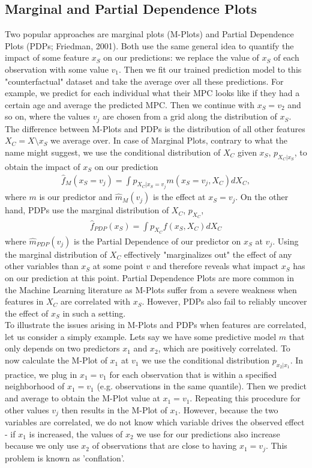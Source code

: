 \subsection{Marginal and Partial Dependence Plots}
Two popular approaches are marginal plots (M-Plots) and Partial Dependence Plots (PDPs; Friedman, 2001). Both use the same general idea to quantify the impact of some feature $x_S$ on our predictions: we replace the value of $x_S$ of each observation with some value $v_1$. Then we fit our trained prediction model to this "counterfactual" dataset and take the average over all these predictions. For example, we predict for each individual what their MPC looks like if they had a certain age and average the predicted MPC. Then we continue with $x_S=v_2$ and so on, where the values $v_j$ are chosen from a grid along the distribution of $x_S$. The difference between M-Plots and PDPs is the distribution of all other features $X_C=X\setminus x_S$ we average over. In case of Marginal Plots, contrary to what the name might suggest, we use the conditional distribution of $X_C$ given $x_S$, $p_{X_C|x_S}$, to obtain the impact of $x_S$ on our prediction
\begin{align}
\hat{f}_M(x_S=v_j)=\int p_{X_C|x_S=v_j} m(x_S=v_j, X_C)dX_C, 
\end{align}
where $m$ is our predictor and $\hat{m}_M(v_j)$ is the effect at $x_S=v_j$. On the other hand, PDPs use the marginal distribution of $X_C$, $p_{X_C}$, 
\begin{align}
    \hat{f}_{PDP}(x_S)=\int p_{X_C} f(x_S, X_C)dX_C \label{eq:pdp}
\end{align}
where $\hat{m}_{PDP}(v_j)$ is the Partial Dependence of our predictor on $x_S$ at $v_j$. Using the marginal distribution of $X_C$ effectively "marginalizes out" the effect of any other variables than $x_S$ at some point $v$ and therefore reveals what impact $x_S$ has on our prediction at this point. Partial Dependence Plots are more common in the Machine Learning literature as M-Plots suffer from a severe weakness when features in $X_C$ are correlated with $x_S$. However, PDPs also fail to reliably uncover the effect of $x_S$ in such a setting. \\
To illustrate the issues arising in M-Plots and PDPs when features are correlated, let us consider a simply example. Lets say we have some predictive model $m$ that only depends on two predictors $x_1$ and $x_2$, which are positively correlated. To now calculate the M-Plot of $x_1$ at $v_1$ we use the conditional distribution $p_{x_2|x_1}$. In practice, we plug in $x_1=v_1$ for each observation that is within a specified neighborhood of $x_1=v_1$ (e.g. observations in the same quantile). Then we predict and average to obtain the M-Plot value at $x_1=v_1$. Repeating this procedure for other values $v_j$ then results in the M-Plot of $x_1$. However, because the two variables are correlated, we do not know which variable drives the observed effect - if $x_1$  is increased, the values of $x_2$  we use for our predictions also increase because we only use $x_2$ of observations that are close to having $x_1=v_j$. This problem is known as 'conflation'. \\
